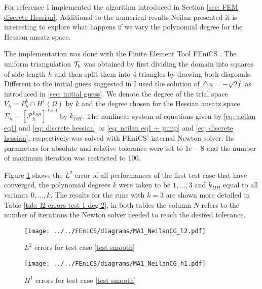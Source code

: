 For reference I implemented the algorithm introduced in Section \ref{sec: FEM discrete Hessian}.
Additional to the numerical results Neilan presented it is interesting to explore what happens if we vary the polynomial degree for the Hessian ansatz space. 

The implementation was done with the Finite Element Tool FEniCS \cite{FEniCS}. The uniform triangulation $\mathcal{T}_h$ was obtained by first dividing the domain into squares of side length $h$ and then split them into 4 triangles by drawing both diagonals. \\
Different to the initial guess suggested in \cite{Neilan2014} I used the solution of $\triangle u = -\sqrt{2f}$ as introduced in \ref{sec: initial guess}. 
We denote the degree of the trial space $V_h=P_h^k \cap H^1(\Omega)$ by $k$ and the degree chosen for the Hessian ansatz space $\Sigma_h = [\mathcal{P}_h^{k_{DH}}]^{d \times d}$ by $k_{DH}$. The nonlinear system of equations given by \eqref{eq: neilan eq1} and \eqref{eq: discrete hessian} or \eqref{eq: neilan eq1 + jump} and \eqref{eq: discrete hessian}, respectively was solved with FEniCS' internal Newton solver. Its parameters for absolute and relative tolerance were set to $1e-8$ and the number of maximum iteration was restricted to 100. 

Figure \ref{fig: l2 errors test 1} shows the $L^2$ error of all performances of the first test case that have converged, the polynomial degrees $k$ were taken to be $1,\dots,3$ and $k_{DH}$ equal to all variants $0, \dots, k$.  The results for the runs with $k=3$ are shown more detailed in Table \ref{tab: l2 errors test 1 deg 2}, in both tables the column $N$ refers to the number of iterations the Newton solver needed to reach the desired tolerance. 



\begin{figure}[h!]
\centering
	\texttt{[image: ../../FEniCS/diagrams/MA1\_NeilanCG\_l2.pdf]}
	\caption{$L^2$ errors for test case \ref{test smooth}}
	\label{fig: l2 errors test 1}
\end{figure}

\begin{figure}[h!]
\centering
	\texttt{[image: ../../FEniCS/diagrams/MA1\_NeilanCG\_h1.pdf]}
	\caption{$H^1$ errors for test case \ref{test smooth}}
	\label{fig: h2 errors test 1}
\end{figure}

